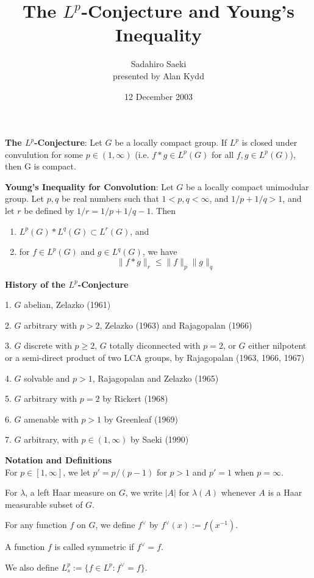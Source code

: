 \documentclass[landscape]{slides}
\title{The $L^p$-Conjecture and Young's Inequality}
\author{Sadahiro Saeki\\presented by Alan Kydd}
\date{12 December 2003}
\begin{document}
\maketitle
\begin{slide}
\textbf{The $L^p$-Conjecture}:
Let $G$ be a locally compact group.  If $L^p$ is closed under convulution for some $p \in (1, \infty)$ (i.e. $f*g \in L^p(G)$ for all $f, g \in L^p(G)$), then G is compact.

\textbf{Young's Inequality for Convolution}:  Let $G$ be a locally compact unimodular group.  Let $p,q$ be real numbers such that $1<p,q<\infty$, and $1/p + 1/q > 1$, and let $r$ be defined by $1/r = 1/p + 1/q - 1$.  Then
\begin{enumerate}
\item $L^p(G) * L^q(G) \subset L^r(G)$, and
\item for $f \in L^p(G)$ and $g \in L^q(G)$, we have
$$\|f*g\|_r \leq \|f\|_p \|g\|_q$$
\end{enumerate}
\end{slide}

\begin{slide}
\textbf{History of the $L^p$-Conjecture}
\begin{list}{}{\topsep 0pt \itemsep -1pt}
\item[1.] $G$ abelian, Zelazko (1961)
\item[2.] $G$ arbitrary with $p>2$, Zelazko (1963) and Rajagopalan (1966)
\item[3.] $G$ discrete with $p\geq2$, $G$ totally diconnected with $p=2$, or $G$ either nilpotent or a semi-direct product of two LCA groups, by Rajagopalan (1963, 1966, 1967)
\item[4.] $G$ solvable and $p>1$, Rajagopalan and Zelazko (1965)
\item[5.] $G$ arbitrary with $p=2$ by Rickert (1968)
\item[6.] $G$ amenable with $p>1$ by Greenleaf (1969)
\item[7.] $G$ arbitrary, with $p\in(1, \infty)$ by Saeki (1990)
\end{list}
\end{slide}

\begin{slide}
\textbf{Notation and Definitions}\\
For $p\in [1, \infty]$, we let $p' = p/(p-1)$ for $p > 1$ and $p'=1$ when $p=\infty$.

For $\lambda$, a left Haar measure on $G$, we write $|A|$ for $\lambda(A)$ whenever $A$ is a Haar measurable subset of $G$.

For any function $f$ on $G$, we define $f^{\vee}$ by $f^{\vee}(x) := f(x^{-1})$.

A function $f$ is called symmetric if $f^{\vee} = f$.

We also define $L^p_s := \{f\in L^p: f^{\vee} = f\}$.
\end{slide}
\end{document}
